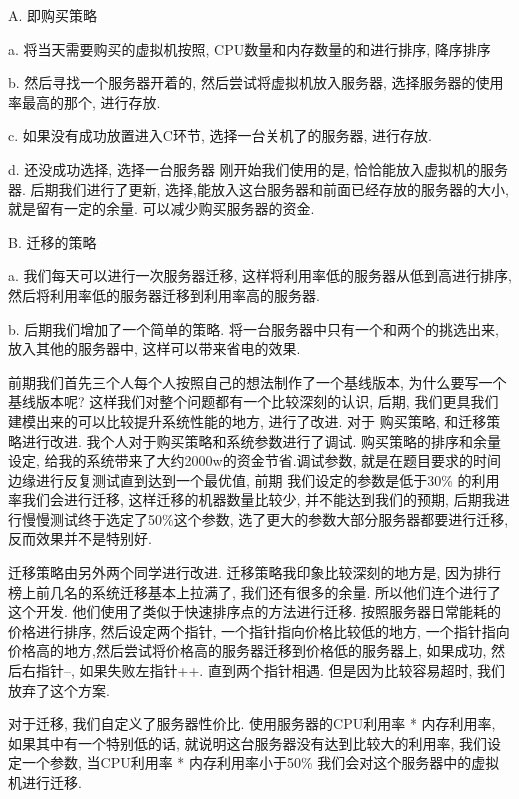 \documentclass[UTF8]{ctexart}
\begin{document}
A. 即购买策略\par
a. 将当天需要购买的虚拟机按照, CPU数量和内存数量的和进行排序, 降序排序\par
b. 然后寻找一个服务器开着的, 然后尝试将虚拟机放入服务器, 选择服务器的使用率最高的那个, 进行存放.\par
c. 如果没有成功放置进入C环节, 选择一台关机了的服务器, 进行存放.\par
d. 还没成功选择, 选择一台服务器 刚开始我们使用的是, 恰恰能放入虚拟机的服务器. 后期我们进行了更新, 选择,能放入这台服务器和前面已经存放的服务器的大小, 就是留有一定的余量. 可以减少购买服务器的资金.\par
B. 迁移的策略\par
a. 我们每天可以进行一次服务器迁移, 这样将利用率低的服务器从低到高进行排序, 然后将利用率低的服务器迁移到利用率高的服务器.\par
b. 后期我们增加了一个简单的策略. 将一台服务器中只有一个和两个的挑选出来, 放入其他的服务器中, 这样可以带来省电的效果.\par

前期我们首先三个人每个人按照自己的想法制作了一个基线版本, 为什么要写一个基线版本呢? 这样我们对整个问题都有一个比较深刻的认识, 后期, 我们更具我们建模出来的可以比较提升系统性能的地方, 进行了改进.
对于 购买策略, 和迁移策略进行改进. 我个人对于购买策略和系统参数进行了调试. 购买策略的排序和余量设定, 给我的系统带来了大约2000w的资金节省.调试参数, 就是在题目要求的时间边缘进行反复测试直到达到一个最优值, 前期 我们设定的参数是低于30\% 的利用率我们会进行迁移, 这样迁移的机器数量比较少, 并不能达到我们的预期, 后期我进行慢慢测试终于选定了50\%这个参数, 选了更大的参数大部分服务器都要进行迁移, 反而效果并不是特别好. \par
迁移策略由另外两个同学进行改进. 迁移策略我印象比较深刻的地方是, 因为排行榜上前几名的系统迁移基本上拉满了, 我们还有很多的余量. 所以他们连个进行了这个开发.
他们使用了类似于快速排序点的方法进行迁移. 按照服务器日常能耗的价格进行排序, 然后设定两个指针, 一个指针指向价格比较低的地方, 一个指针指向价格高的地方,然后尝试将价格高的服务器迁移到价格低的服务器上, 如果成功, 然后右指针--, 如果失败左指针++. 直到两个指针相遇. 但是因为比较容易超时, 我们放弃了这个方案. \par
对于迁移, 我们自定义了服务器性价比. 使用服务器的CPU利用率 * 内存利用率, 如果其中有一个特别低的话, 就说明这台服务器没有达到比较大的利用率, 我们设定一个参数, 当CPU利用率 *  内存利用率小于50\% 我们会对这个服务器中的虚拟机进行迁移. \par
\end{document}
